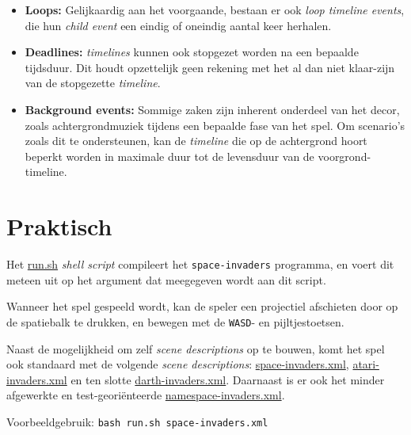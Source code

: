 \documentclass[10pt,a4paper]{article}
\begin{document}
\begin{itemize}
\begin{itemize}
\item \textbf{Loops:} Gelijkaardig aan het voorgaande, bestaan er ook
\emph{loop timeline events}, die hun \emph{child event} een eindig of
oneindig aantal keer herhalen.

\item \textbf{Deadlines:} \emph{timelines} kunnen ook stopgezet worden na
een bepaalde tijdsduur. Dit houdt opzettelijk geen rekening met het
al dan niet klaar-zijn van de stopgezette \emph{timeline}.

\item \textbf{Background events:} Sommige zaken zijn inherent onderdeel van
het decor, zoals achtergrondmuziek tijdens een bepaalde fase van het spel.
Om scenario's zoals dit te ondersteunen, kan de \emph{timeline} die op 
de achtergrond hoort beperkt worden in maximale duur tot de levensduur
van de voorgrond-timeline.

\end{itemize}

\end{itemize}

\section{Praktisch}

Het \url{run.sh} \emph{shell script} compileert het 
\texttt{space-invaders} programma, en
voert dit meteen uit op het argument dat meegegeven wordt aan dit
script.

Wanneer het spel gespeeld wordt, kan de speler een projectiel afschieten 
door op de spatiebalk te drukken, en bewegen met de \texttt{WASD}- en 
pijltjestoetsen.

Naast de mogelijkheid om zelf \emph{scene descriptions} op te bouwen, komt
het spel ook standaard met de volgende \emph{scene descriptions}:
\url{space-invaders.xml}, \url{atari-invaders.xml} 
en ten slotte \url{darth-invaders.xml}. Daarnaast is er ook het
minder afgewerkte en test-geori\"enteerde \url{namespace-invaders.xml}.

Voorbeeldgebruik: \texttt{bash run.sh space-invaders.xml}
\end{document}
